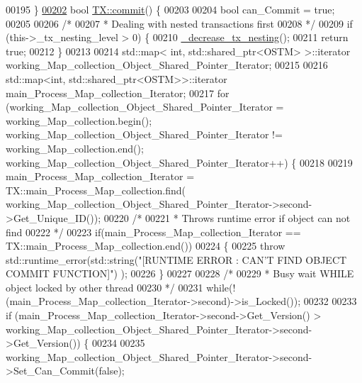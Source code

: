 \begin{DoxyCode}
00195 \}
\hypertarget{_t_x_8cpp_source.tex_l00202}{}\hyperlink{class_t_x_a9dde5d356b35e557448e58d260087356}{00202} \textcolor{keywordtype}{bool} \hyperlink{class_t_x_a9dde5d356b35e557448e58d260087356}{TX::commit}() \{
00203 
00204     \textcolor{keywordtype}{bool} can\_Commit = \textcolor{keyword}{true};
00205  
00206     \textcolor{comment}{/*}
00207 \textcolor{comment}{     * Dealing with nested transactions first }
00208 \textcolor{comment}{     */}
00209     \textcolor{keywordflow}{if} (this->\_tx\_nesting\_level > 0) \{
00210         \hyperlink{class_t_x_aa3ac499f576326588628ade96b27b4b1}{\_decrease\_tx\_nesting}();
00211         \textcolor{keywordflow}{return} \textcolor{keyword}{true};
00212     \} 
00213     
00214     std::map< int, std::shared\_ptr<OSTM> >::iterator working\_Map\_collection\_Object\_Shared\_Pointer\_Iterator;
00215 
00216     std::map<int, std::shared\_ptr<OSTM>>::iterator main\_Process\_Map\_collection\_Iterator;
00217     \textcolor{keywordflow}{for} (working\_Map\_collection\_Object\_Shared\_Pointer\_Iterator = working\_Map\_collection.begin(); 
      working\_Map\_collection\_Object\_Shared\_Pointer\_Iterator != working\_Map\_collection.end(); 
      working\_Map\_collection\_Object\_Shared\_Pointer\_Iterator++) \{
00218 
00219             main\_Process\_Map\_collection\_Iterator = TX::main\_Process\_Map\_collection.find(
      working\_Map\_collection\_Object\_Shared\_Pointer\_Iterator->second->Get\_Unique\_ID());
00220             \textcolor{comment}{/*}
00221 \textcolor{comment}{             * Throws runtime error if object can not find}
00222 \textcolor{comment}{             */}
00223             \textcolor{keywordflow}{if}(main\_Process\_Map\_collection\_Iterator == TX::main\_Process\_Map\_collection.end())
00224             \{
00225                 \textcolor{keywordflow}{throw} std::runtime\_error(std::string(\textcolor{stringliteral}{"[RUNTIME ERROR : CAN'T FIND OBJECT COMMIT FUNCTION]"})
      );
00226             \}
00227 
00228         \textcolor{comment}{/*}
00229 \textcolor{comment}{         * Busy wait WHILE object locked by other thread}
00230 \textcolor{comment}{         */}
00231         \textcolor{keywordflow}{while}(!(main\_Process\_Map\_collection\_Iterator->second)->is\_Locked());
00232 
00233         \textcolor{keywordflow}{if} (main\_Process\_Map\_collection\_Iterator->second->Get\_Version() > 
      working\_Map\_collection\_Object\_Shared\_Pointer\_Iterator->second->Get\_Version()) \{
00234 
00235             working\_Map\_collection\_Object\_Shared\_Pointer\_Iterator->second->Set\_Can\_Commit(\textcolor{keyword}{false});

\end{DoxyCode}
